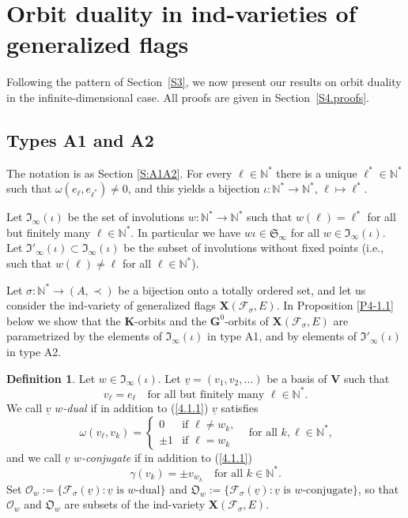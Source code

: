 \documentclass{amsart}
\theoremstyle{definition}
\newtheorem{definition}{Definition}
\newcommand{\NN}{\mathbb{N}^*}
\newcommand{\bs}[1]{\boldsymbol{#1}}
\begin{document}
\section{Orbit duality in ind-varieties of generalized flags}

\label{S4}

Following the pattern of Section~\ref{S3}, we now present our results on orbit duality in the infinite-dimensional case.  All proofs are given in Section~\ref{S4.proofs}.
\subsection{Types A1 and A2}

\label{S4.1}

The notation is as Section \ref{S:A1A2}.
For every $\ell\in\NN$ there is a unique $\ell^*\in\NN$
such that $\omega(e_\ell,e_{\ell^*})\not=0$,
and this yields a bijection $\iota:\NN\to\NN$, $\ell\mapsto\ell^*$.

Let $\mathfrak{I}_\infty(\iota)$ be the set of involutions $w:\NN\to\NN$
such that $w(\ell)=\ell^*$ for all but finitely many $\ell\in\NN$.
In particular we have $w\iota\in\mathfrak{S}_\infty$ for all $w\in\mathfrak{I}_\infty(\iota)$.
Let $\mathfrak{I}'_\infty(\iota)\subset \mathfrak{I}_\infty(\iota)$
be the subset of involutions without fixed points (i.e., such that $w(\ell)\not=\ell$ for all $\ell\in\NN$).

Let $\sigma:\NN\to(A,\prec)$ be a bijection onto a totally ordered set,
and let us consider the ind-variety of generalized flags $\mathbf{X}(\mathcal{F}_\sigma,E)$.
In Proposition \ref{P4-1.1} below we show that the $\mathbf{K}$-orbits 
and the $\mathbf{G}^0$-orbits of $\mathbf{X}(\mathcal{F}_\sigma,E)$ are parametrized by the elements of $\mathfrak{I}_\infty(\iota)$ in type A1, and by elements of $\mathfrak{I}'_\infty(\iota)$ in type A2.

\begin{definition}
Let $w\in\mathfrak{I}_\infty(\iota)$.
Let $\underline{v}=(v_1,v_2,\ldots)$ be a basis of $\mathbf{V}$ such that
\begin{equation}
\label{4.1.1}
v_\ell=e_\ell\quad\mbox{for all but finitely many $\ell\in\NN$}.
\end{equation}
We call $\underline{v}$ {\em $w$-dual} if in addition to (\ref{4.1.1}) $\underline{v}$ satisfies
\[\omega(v_\ell,v_k)=\left\{
\begin{array}{ll}
0 & \mbox{if $\ell\not=w_k$,} \\
\pm1 & \mbox{if $\ell=w_k$}
\end{array}
\quad\mbox{for all $k,\ell\in\NN$,}
\right.\]
and we call $\underline{v}$ {\em $w$-conjugate} if in addition to (\ref{4.1.1}) 
\[\gamma(v_k)=\pm v_{w_k}\quad\mbox{for all $k\in\NN$.}\]
Set
$\bs{\mathcal{O}}_w:=\{\mathcal{F}_{\sigma}(\underline{v}):\mbox{$\underline{v}$ is $w$-dual}\}$ and $\bs{\mathfrak{O}}_w:=\{\mathcal{F}_{\sigma}(\underline{v}):\mbox{$\underline{v}$ is $w$-conjugate}\}$, so that $\bs{\mathcal{O}}_w$ and $\bs{\mathfrak{O}}_w$ are subsets of the ind-variety $\mathbf{X}(\mathcal{F}_\sigma,E)$.
\end{definition}
\end{document}
